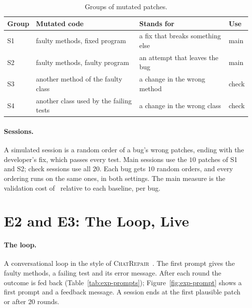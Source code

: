 \begin{table}[htbp]
\centering
\caption{Groups of mutated patches.}
\label{tab:exp-strata}
\footnotesize
\begin{tabularx}{\textwidth}{@{}l >{\raggedright\arraybackslash}p{} >{\raggedright\arraybackslash}X l@{}}
\toprule
Group & Mutated code & Stands for & Use\\
\midrule
S1 & faulty methods, fixed program & a fix that breaks something else & main\\
S2 & faulty methods, faulty program & an attempt that leaves the bug & main\\
S3 & another method of the faulty class & a change in the wrong method & check\\
S4 & another class used by the failing tests & a change in the wrong class & check\\
\bottomrule
\end{tabularx}
\end{table}

\paragraph{Sessions.} A simulated session is a random order of a bug's wrong
patches, ending with the developer's fix, which passes every test. Main
sessions use the $10$ patches of S1 and S2; check sessions use all $20$. Each
bug gets $10$ random orders, and every ordering runs on the same ones, in both
settings. The main measure is the validation cost of \km\ relative to each
baseline, per bug.

\section{E2 and E3: The Loop, Live}
\label{sec:exp-live}

\paragraph{The loop.} A conversational loop in the style of
\textsc{ChatRepair}~\citep{xia2024chatrepair}. The first prompt gives the faulty
methods, a failing test and its error message. After each round the outcome is
fed back (Table~\ref{tab:exp-prompts}); Figure~\ref{fig:exp-prompt} shows a first
prompt and a feedback message. A session ends at the first plausible patch or
after $20$ rounds.

